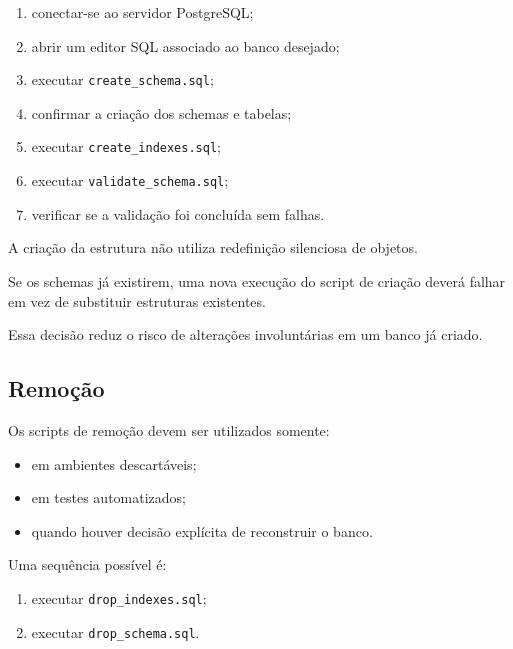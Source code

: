 \documentclass[12pt,a4paper]{article}
\begin{document}
{\begin{enumerate}[leftmargin=1.2cm]
		\item conectar-se ao servidor PostgreSQL;
		
		\item abrir um editor SQL associado ao banco desejado;
		
		\item executar \texttt{create\_schema.sql};
		
		\item confirmar a criação dos schemas e tabelas;
		
		\item executar \texttt{create\_indexes.sql};
		
		\item executar \texttt{validate\_schema.sql};
		
		\item verificar se a validação foi concluída sem falhas.
		
	\end{enumerate}
	
	A criação da estrutura não utiliza redefinição silenciosa de objetos.
	
	Se os schemas já existirem, uma nova execução do script de criação
	deverá falhar em vez de substituir estruturas existentes.
	
	Essa decisão reduz o risco de alterações involuntárias em um banco já
	criado.
	
	\subsection{Remoção}
	
	Os scripts de remoção devem ser utilizados somente:
	
	\begin{itemize}[leftmargin=1.2cm]
		\item em ambientes descartáveis;
		\item em testes automatizados;
		\item quando houver decisão explícita de reconstruir o banco.
	\end{itemize}
	
	Uma sequência possível é:
	
	\begin{enumerate}[leftmargin=1.2cm]
		\item executar \texttt{drop\_indexes.sql};
		\item executar \texttt{drop\_schema.sql}.
	\end{enumerate}
	
}
\end{document}
